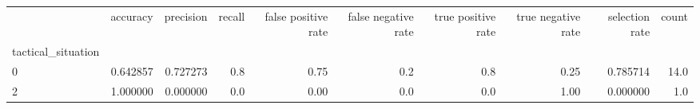 \begin{tabular}{lrrrrrrrrr}
\toprule
{} &  accuracy &  precision &  recall &  false positive rate &  false negative rate &  true positive rate &  true negative rate &  selection rate &  count \\
tactical\_situation &           &            &         &                      &                      &                     &                     &                 &        \\
\midrule
0                  &  0.642857 &   0.727273 &     0.8 &                 0.75 &                  0.2 &                 0.8 &                0.25 &        0.785714 &   14.0 \\
2                  &  1.000000 &   0.000000 &     0.0 &                 0.00 &                  0.0 &                 0.0 &                1.00 &        0.000000 &    1.0 \\
\bottomrule
\end{tabular}

